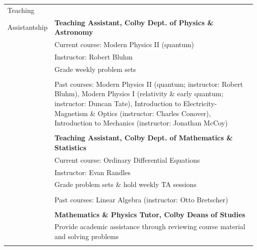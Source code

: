 \documentclass[10pt]{article}
\begin{document}
\begin{longtable}{ l m{13.5cm}   }
   						
   
     					
     					

     					   					 
     					 
     					 
  \large{Teaching}   	& \\ 
  \large{Assistantship} & \textbf{Teaching Assistant, Colby Dept. of Physics \& Astronomy} \\
  						& Current course: Modern Physics II (quantum)\\
    					& Instructor: Robert Bluhm \\
    					& Grade weekly problem sets \\ \vspace{-9pt}
     					& \\ 
     					& Past courses: Modern Physics II (quantum; instructor: Robert Bluhm), Modern Physics I (relativity \& early quantum; instructor: Duncan Tate), Introduction to Electricity-Magnetism \& Optics (instructor: Charles Conover), Introduction to Mechanics (instructor: Jonathan McCoy)\\
     					& \\
     					 
     					& \textbf{Teaching Assistant, Colby Dept. of Mathematics \& Statistics} \\
     					& Current course: Ordinary Differential Equations\\
     					& Instructor: Evan Randles \\
     					& Grade problem sets \& hold weekly TA sessions \\ \vspace{-9pt}
     					& \\ 
     					& Past courses: Linear Algebra (instructor: Otto Bretscher)\\
     					& \\
     					 
     					& \textbf{Mathematics \& Physics Tutor, Colby Deans of Studies} \\
     					& Provide academic assistance through reviewing course material and solving problems \\
     					& \\
     					 
     					 
     					 

\end{longtable}
\end{document}
